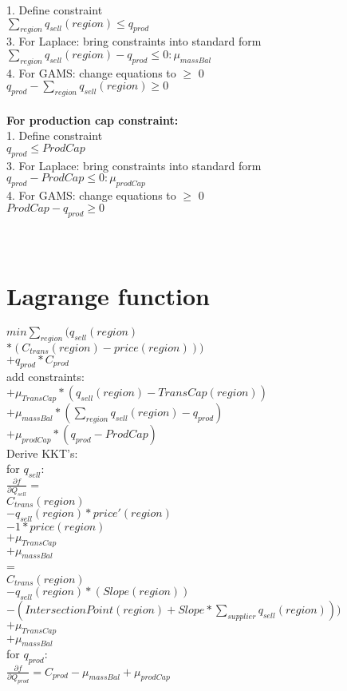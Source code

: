 \documentclass{article}
\begin{document}
1. Define constraint\\
\quad$\sum_{region} q_{sell}(region) \leq q_{prod} $\\
3. For Laplace: bring constraints into standard form\\
\quad$\sum_{region} q_{sell}(region) - q_{prod}  \leq 0 : \mu_{massBal}$\\
4. For GAMS: change equations to $\geq$ 0\\
\quad$q_{prod}  - \sum_{region} q_{sell}(region) \geq 0\: $\\


\hfill\\
\textbf{For	production cap constraint: }\\
1. Define constraint\\
\quad$q_{prod} \leq ProdCap$\\
3. For Laplace: bring constraints into standard form\\
\quad$q_{prod} - ProdCap\leq 0  : \mu_{prodCap}$\\
4. For GAMS: change equations to $\geq$ 0\\
\quad$ProdCap - q_{prod} \geq 0$\\


\hfill\\ 
\hfill\\
\section*{Lagrange function}
\quad$min \sum_{region}\Big( q_{sell}(region) $\\
\quad$*(C_{trans}(region) - price(region))\Big) $\\
\quad$+ q_{prod}*C_{prod}$\\
add constraints:\\
\quad$+\mu_{TransCap} * (q_{sell}(region) - TransCap(region))$\\
\quad$+\mu_{massBal} * (\sum_{region} q_{sell}(region) - q_{prod})$\\
\quad$+\mu_{prodCap}* (q_{prod} - ProdCap)$\\

Derive KKT's:\\ 	
for $q_{sell}:$\\
\quad$\frac{\partial f}{\partial Q_{sell}} = $\\
\quad$C_{trans}(region)$\\ 
\quad$-q_{sell}(region)*price'(region)$\\
\quad$-1*price(region)$\\
\quad$+\mu_{TransCap}$\\
\quad$+\mu_{massBal}$\\
\quad =\\
\quad$C_{trans}(region)$\\
\quad$-q_{sell}(region)*(Slope(region))$\\
\quad$- (IntersectionPoint(region) + Slope * \sum_{supplier} q_{sell}(region)))$\\
\quad$+\mu_{TransCap}$\\
\quad$+\mu_{massBal}$\\
for $q_{prod}:$\\
\quad$\frac{\partial f}{\partial Q_{prod}} = C_{prod} - \mu_{massBal} + \mu_{prodCap}$\\
\end{document}
